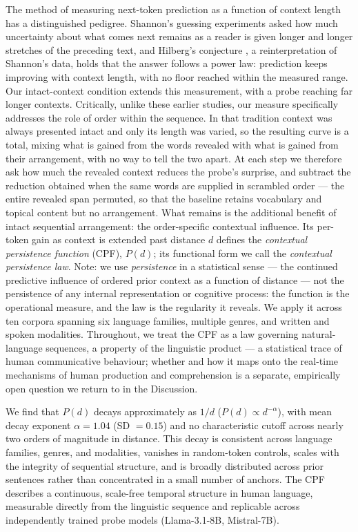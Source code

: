 \documentclass[11pt]{article}
\begin{document}
The method of measuring next-token prediction as a function of context length has a distinguished
pedigree. Shannon's guessing experiments
\citep{shannon1951prediction} asked how much uncertainty about what comes next remains as a reader
is given longer and longer stretches of the preceding text, and Hilberg's conjecture
\citep{hilberg1990grenzwert, debowski2015relaxed}, a reinterpretation of Shannon's data, holds
that the answer follows a power law: prediction keeps improving with context length, with no
floor reached within the measured range. Our intact-context condition extends this measurement,
with a probe reaching far longer contexts. Critically, unlike these earlier studies, our measure
specifically addresses the role of order within the sequence. In that tradition context was always
presented intact and only its length was varied, so the resulting curve is a total, mixing what is
gained from the words revealed with what is gained from their arrangement, with no way to tell the
two apart. At
each step we therefore ask how much the revealed context reduces the probe's surprise, and subtract the
reduction obtained when the same words are supplied in scrambled order --- the entire revealed span
permuted, so that the baseline retains vocabulary and topical content but no arrangement. What
remains is the additional benefit of intact sequential arrangement: the order-specific contextual
influence. Its per-token gain as context is extended past distance $d$ defines the
\emph{contextual persistence function} (CPF), $P(d)$; its functional form we call the
\emph{contextual persistence law}. Note: we use \emph{persistence} in a statistical sense --- the
continued predictive influence of ordered prior context as a function of distance --- not the
persistence of any internal representation or cognitive process: the function is the
operational measure, and the law is the regularity it reveals. We apply it across ten
corpora spanning six language families, multiple genres, and written and spoken modalities.
Throughout, we treat the CPF as a law governing natural-language sequences, a property of
the linguistic product --- a statistical trace of human communicative behaviour; whether and how it maps onto the real-time mechanisms of human
production and comprehension is a separate, empirically open question we return to in the
Discussion.

We find that $P(d)$ decays approximately as $1/d$ ($P(d)\propto d^{-\alpha}$), with mean decay exponent
$\alpha=1.04$ (SD $=0.15$) and no characteristic cutoff across nearly two orders of magnitude in distance. This decay
is consistent across language families, genres, and modalities, vanishes in
random-token controls, scales with the integrity of sequential structure, and is
broadly distributed across prior sentences rather than concentrated in a small number
of anchors. The CPF describes a continuous, scale-free temporal
structure in human language, measurable directly from the linguistic sequence and
replicable across independently trained probe models
(Llama-3.1-8B, Mistral-7B).
\end{document}
